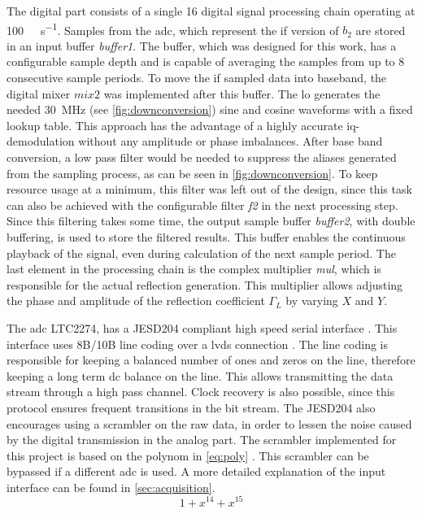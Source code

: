 \documentclass[12pt,a4paper,parskip=full,abstract=true,BCOR=10mm,twoside,open=right]{scrreprt}
\begin{document}
The digital part consists of a single \SI{16}{\bit} digital signal processing
chain operating at \SI{100}{\mega\samples\per\second}. Samples from
the \gls{adc}, which represent the \gls{if} version of $b_2$ are stored in an input
buffer \textit{buffer1}. The buffer, which was designed for this work, has a configurable
sample depth and is capable of averaging the samples from up to 8 consecutive sample
periods. To move the \gls{if} sampled data into baseband, the digital mixer $mix2$ was implemented
after this buffer. The \gls{lo} generates the needed \SI{30}{\mega\hertz} (see \cref{fig:downconversion})
sine and cosine waveforms with a fixed lookup table. This approach has the
advantage of a highly accurate \gls{iq}-demodulation without any amplitude or
phase imbalances. After base band conversion, a low pass filter would be needed to
suppress the aliases generated from the sampling process, as can be seen in
\cref{fig:downconversion}. To keep resource usage at a minimum, this filter was
left out of the design, since this task can also be achieved with the configurable
filter \textit{f2} in the next processing step. Since this filtering takes some time,
the output sample buffer \textit{buffer2}, with double buffering, is used to store
the filtered results. This buffer enables the continuous playback of the signal, even
during calculation of the next sample period. The last element in the processing chain
is the complex multiplier \textit{mul}, which is responsible for the actual reflection
generation. This multiplier allows adjusting the phase and amplitude of the reflection
coefficient $\Gamma_L$ by varying $X$ and $Y$.

The \gls{adc} LTC2274, has a JESD204 compliant high speed serial interface \cite{ltc2274}.
This interface uses 8B/10B line coding over a \gls{lvds} connection \cite{jesd205B.01}. The line coding
is responsible for keeping a balanced number of ones and zeros on the line, therefore keeping a long term
\gls{dc} balance on the line. This allows transmitting the data stream through a high pass
channel. Clock recovery is also possible, since this protocol ensures frequent transitions
in the bit stream. The JESD204 also encourages using a scrambler on the raw data, in order to lessen the
noise caused by the digital transmission in the analog part. The scrambler implemented for
this project is based on the polynom in \cref{eq:poly} \cite{jesd205B.01}. This scrambler can
be bypassed if a different \gls{adc} is used. A more detailed explanation of the input interface
can be found in \cref{sec:acquisition}.
\begin{equation}
    \label{eq:poly} 1 + x^{14} + x^{15}
\end{equation}
\end{document}
